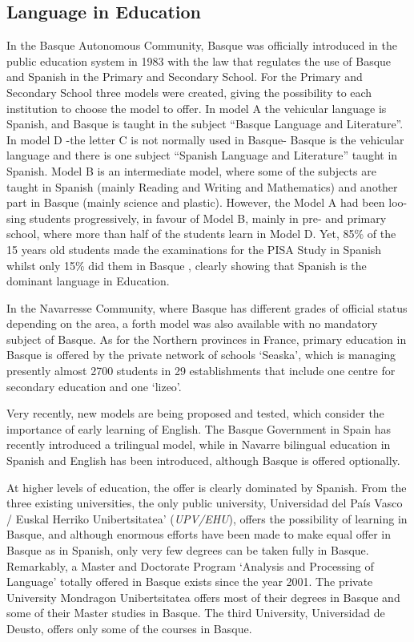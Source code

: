 \begin{multicols}{2}
\subsection{Language in Education}
    In the Basque Autonomous Community, Basque was officially introduced in the public education system in 1983 with the law that regulates the use of Basque and Spanish in the Primary and Secondary School. For the Primary and Secondary School three models were created, giving the possibility to each institution to choose the model to offer. In model A the vehicular language is Spanish, and Basque is taught in the subject “Basque Language and Literature”. In model D -the letter C is not normally used in Basque- Basque is the vehicular language and there is one subject “Spanish Language and Literature” taught in Spanish. Model B is an intermediate model, where some of the subjects are taught in Spanish (mainly Reading and Writing and Mathematics) and another part in Basque (mainly science and plastic). However, the Model A had been loo-sing students progressively, in favour of Model B, mainly in pre- and primary school, where more than half of the students learn in Model D. Yet, 85\% of the 15 years old students made the examinations for the PISA Study in Spanish whilst only 15\% did them in Basque \cite{BAS-Nota12}, clearly showing that Spanish is the dominant language in Education. 

In the Navarresse Community, where Basque has different grades of official status depending on the area, a forth model was also available with no mandatory subject of Basque. As for the Northern provinces in France, primary education in Basque is offered by the private network of schools ‘Seaska’, which is managing presently almost 2700 students in 29 establishments that include one centre for secondary education and one ‘lizeo’. 

Very recently, new models are being proposed and tested, which consider the importance of early learning of English. The Basque Government in Spain has recently introduced a trilingual model, while in Navarre bilingual education in Spanish and English has been introduced, although Basque is offered optionally. 

At higher levels of education, the offer is clearly dominated by Spanish. From the three existing universities, the only public university, Universidad del País Vasco / Euskal Herriko Unibertsitatea’ (\textit{UPV/EHU}), offers the possibility of learning in Basque, and although enormous efforts have been made to make equal offer in Basque as in Spanish, only very few degrees can be taken fully in Basque. Remarkably, a Master and Doctorate Program ‘Analysis and Processing of Language’ \cite{BAS-Nota13}  totally offered in Basque exists since the year 2001.  The private University Mondragon Unibertsitatea offers most of their degrees in Basque and some of their Master studies in Basque. The third University, Universidad de Deusto, offers only some of the courses in Basque.


\end{multicols}
